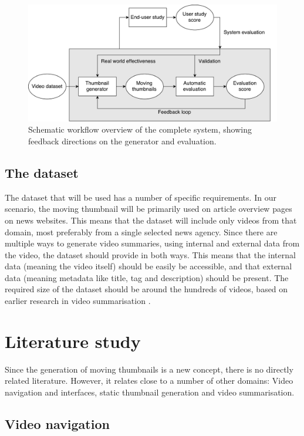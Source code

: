 \documentclass{../resources/acm_proc_article-sp}
\begin{document}
\begin{figure}[h]
  \label{fig:workflow}
  \includegraphics[width=\linewidth]{images/thesis-system.pdf}
  \caption{Schematic workflow overview of the complete system, showing feedback directions on the generator and evaluation.}
\end{figure}

\subsection{The dataset}

The dataset that will be used has a number of specific requirements. In our scenario, the moving thumbnail will be primarily used on article overview pages on news websites. This means that the dataset will include only videos from that domain, most preferably from a single selected news agency. Since there are multiple ways to generate video summaries, using internal and external data from the video, the dataset should provide in both ways. This means that the internal data (meaning the video itself) should be easily be accessible, and that external data (meaning metadata like title, tag and description) should be present. The required size of the dataset should be around the hundreds of videos, based on earlier research in video summarisation \cite{Almeida:2012be,Christel:2004in,Money:2008fn}.

\section{Literature study}

Since the generation of moving thumbnails is a new concept, there is no directly related literature. However, it relates close to a number of other domains: Video navigation and interfaces, static thumbnail generation and video summarisation.

\subsection{Video navigation}
\end{document}
